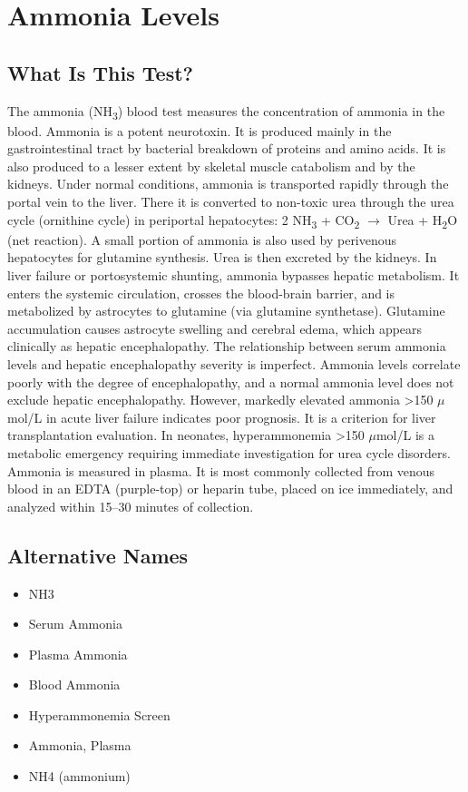 \chapter{Ammonia Levels}

\section*{What Is This Test?}
The ammonia (NH\textsubscript{3}) blood test measures the concentration of ammonia in the blood. Ammonia is a potent neurotoxin. It is produced mainly in the gastrointestinal tract by bacterial breakdown of proteins and amino acids. It is also produced to a lesser extent by skeletal muscle catabolism and by the kidneys. Under normal conditions, ammonia is transported rapidly through the portal vein to the liver. There it is converted to non-toxic urea through the urea cycle (ornithine cycle) in periportal hepatocytes: 2 NH\textsubscript{3} + CO\textsubscript{2} $\rightarrow$ Urea + H\textsubscript{2}O (net reaction). A small portion of ammonia is also used by perivenous hepatocytes for glutamine synthesis. Urea is then excreted by the kidneys. In liver failure or portosystemic shunting, ammonia bypasses hepatic metabolism. It enters the systemic circulation, crosses the blood-brain barrier, and is metabolized by astrocytes to glutamine (via glutamine synthetase). Glutamine accumulation causes astrocyte swelling and cerebral edema, which appears clinically as hepatic encephalopathy. The relationship between serum ammonia levels and hepatic encephalopathy severity is imperfect. Ammonia levels correlate poorly with the degree of encephalopathy, and a normal ammonia level does not exclude hepatic encephalopathy. However, markedly elevated ammonia >150 $\mu$mol/L in acute liver failure indicates poor prognosis. It is a criterion for liver transplantation evaluation. In neonates, hyperammonemia >150 $\mu$mol/L is a metabolic emergency requiring immediate investigation for urea cycle disorders. Ammonia is measured in plasma. It is most commonly collected from venous blood in an EDTA (purple-top) or heparin tube, placed on ice immediately, and analyzed within 15--30 minutes of collection.

\section*{Alternative Names}
\begin{itemize}
  \item NH3
  \item Serum Ammonia
  \item Plasma Ammonia
  \item Blood Ammonia
  \item Hyperammonemia Screen
  \item Ammonia, Plasma
  \item NH4 (ammonium)
\end{itemize}
